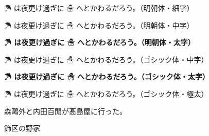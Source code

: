 \documentclass{ltjsarticle}
\begin{document}
{\mcfamily\ltseries ☂ は夜更け過ぎに ☃ へとかわるだろう。（明朝体・細字）}\par
{\mcfamily          ☂ は夜更け過ぎに ☃ へとかわるだろう。（明朝体・中字）}\par
{\mcfamily\bfseries ☂ は夜更け過ぎに ☃ へとかわるだろう。（明朝体・太字）}\par

{\gtfamily          ☂ は夜更け過ぎに ☃ へとかわるだろう。（ゴシック体・中字）}\par
{\gtfamily\bfseries ☂ は夜更け過ぎに ☃ へとかわるだろう。（ゴシック体・太字）}\par
{\gtfamily\ebseries ☂ は夜更け過ぎに ☃ へとかわるだろう。（ゴシック体・極太）}

森鷗外と内田百閒が髙島屋に行った。

飾区の野家  %
\end{document}
